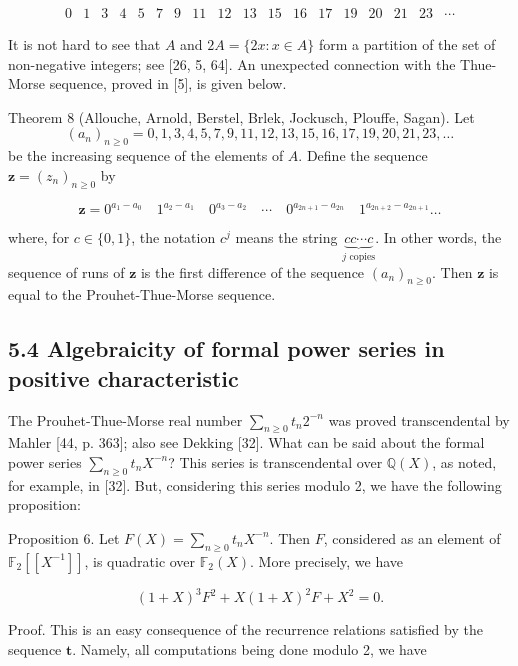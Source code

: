 \documentclass[10pt]{article}
\begin{document}
\[
\begin{array}{llllllllllllllllll}
0 & 1 & 3 & 4 & 5 & 7 & 9 & 11 & 12 & 13 & 15 & 16 & 17 & 19 & 20 & 21 & 23 & \cdots
\end{array}
\]

It is not hard to see that $A$ and $2 A=\{2 x: x \in A\}$ form a partition of the set of non-negative integers; see [26, 5, 64]. An unexpected connection with the Thue-Morse sequence, proved in [5], is given below.

Theorem 8 (Allouche, Arnold, Berstel, Brlek, Jockusch, Plouffe, Sagan). Let
\[
(a_n)_{n\geq 0}=0,1,3,4,5,7,9,11,12,13,15,16,17,19,20,21,23,\ldots
\]
be the increasing sequence of the elements of $A$. Define the sequence $\mathbf{z}=\left(z_{n}\right)_{n \geq 0}$ by

\[
\mathbf{z}=0^{a_{1}-a_{0}} \quad 1^{a_{2}-a_{1}} \quad 0^{a_{3}-a_{2}} \quad \cdots \quad 0^{a_{2 n+1}-a_{2 n}} \quad 1^{a_{2 n+2}-a_{2 n+1}} \ldots
\]

where, for $c\in\{0,1\}$, the notation $c^j$ means the string $\underbrace{cc\cdots c}_{j\text{ copies}}$. In other words, the sequence of runs of $\mathbf{z}$ is the first difference of the sequence $\left(a_{n}\right)_{n \geq 0}$. Then $\mathbf{z}$ is equal to the Prouhet-Thue-Morse sequence.

\subsection*{5.4 Algebraicity of formal power series in positive characteristic}
The Prouhet-Thue-Morse real number $\sum_{n\geq 0} t_n2^{-n}$ was proved transcendental by Mahler [44, p. 363]; also see Dekking [32]. What can be said about the formal power series $\sum_{n\geq 0} t_nX^{-n}$? This series is transcendental over $\mathbb{Q}(X)$, as noted, for example, in [32]. But, considering this series modulo 2, we have the following proposition:

Proposition 6. Let $F(X)=\sum_{n \geq 0} t_{n} X^{-n}$. Then $F$, considered as an element of $\mathbb{F}_{2}\left[\left[X^{-1}\right]\right]$, is quadratic over $\mathbb{F}_{2}(X)$. More precisely, we have


\begin{equation*}
(1+X)^{3} F^{2}+X(1+X)^{2} F+X^{2}=0. \tag{2}
\end{equation*}


Proof. This is an easy consequence of the recurrence relations satisfied by the sequence $\mathbf{t}$. Namely, all computations being done modulo 2, we have
\end{document}
